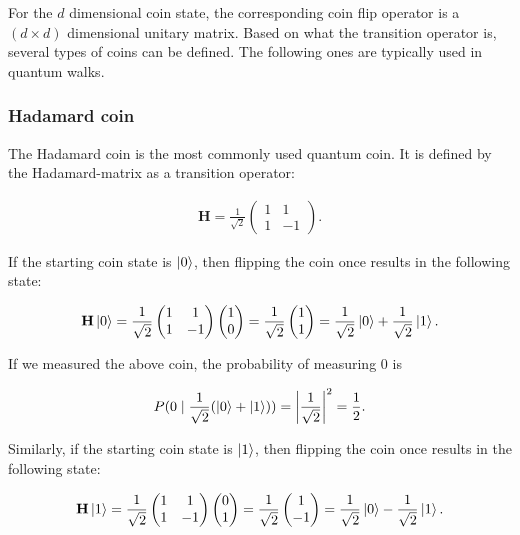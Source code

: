 For the $d$ dimensional coin state, the corresponding coin flip operator is a $(d\times{}d)$ dimensional unitary matrix. Based on what the transition operator is, several types of coins can be defined. The following ones are typically used in quantum walks.

\subsubsection{Hadamard coin}

The Hadamard coin is the most commonly used quantum coin. It is defined by the Hadamard-matrix as a transition operator:

\begin{align*}
  \mathbf{H} = \frac{1}{\sqrt{2}}\begin{pmatrix}
      1 & 1  \\
      1 & -1
    \end{pmatrix}.
\end{align*}

If the starting coin state is $\ket{0}$, then flipping the coin once results in the following state:

\begin{align*}
 \mathbf{H}\ket{0} = \frac{1}{\sqrt{2}}\begin{pmatrix}
      1 & 1  \\
      1 & -1
    \end{pmatrix} \begin{pmatrix} 1 \\ 0 \end{pmatrix}
    = \frac{1}{\sqrt{2}} \begin{pmatrix} 1 \\ 1 \end{pmatrix} = \frac{1}{\sqrt{2}} \ket{0} + \frac{1}{\sqrt{2}} \ket{1}.
\end{align*}

If we measured the above coin, the probability of measuring $0$ is

\begin{align*}
P(0 \mid \frac{1}{\sqrt{2}} (\ket{0} + \ket{1})) =
\left\lvert\frac{1}{\sqrt{2}}\right\rvert^2 =
\frac{1}{2}.
\end{align*}

Similarly, if the starting coin state is $\ket{1}$, then flipping the coin once results in the following state:

\begin{align*}
   \mathbf{H}\ket{1} = \frac{1}{\sqrt{2}}\begin{pmatrix}
      1 & 1  \\
      1 & -1
    \end{pmatrix} \begin{pmatrix} 0 \\ 1 \end{pmatrix}
    = \frac{1}{\sqrt{2}} \begin{pmatrix} 1 \\ -1 \end{pmatrix} = \frac{1}{\sqrt{2}} \ket{0} - \frac{1}{\sqrt{2}} \ket{1}.
\end{align*}

